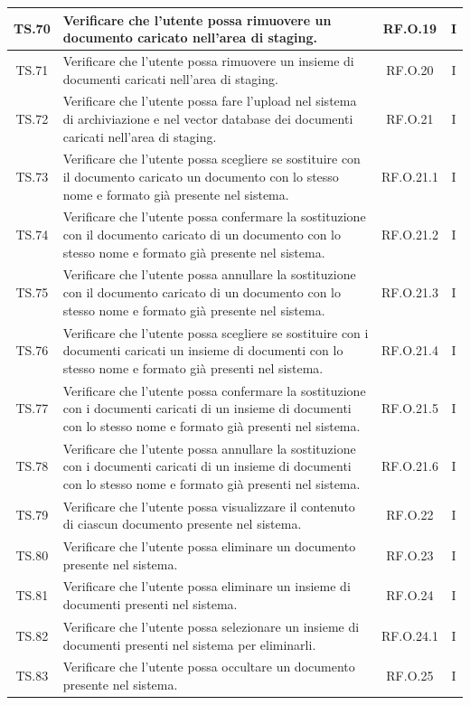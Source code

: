 \begin{xltabular}{\textwidth}{|c|X|c|c|}
\hline
TS.70 & Verificare che l'utente possa rimuovere un documento caricato nell’area di staging. & RF.O.19 & I \\
\hline
TS.71 & Verificare che l'utente possa rimuovere un insieme di documenti caricati nell’area di staging. & RF.O.20 & I \\
\hline
TS.72 & Verificare che l'utente possa fare l’upload nel sistema di archiviazione e nel vector database dei documenti caricati nell’area di staging. & RF.O.21 & I \\
\hline
TS.73 & Verificare che l'utente possa scegliere se sostituire con il documento caricato un documento con lo stesso nome e formato già presente nel sistema. & RF.O.21.1 & I \\
\hline
TS.74 & Verificare che l'utente possa confermare la sostituzione con il documento caricato di un documento con lo stesso nome e formato già presente nel sistema. & RF.O.21.2 & I \\
\hline
TS.75 & Verificare che l'utente possa annullare la sostituzione con il documento caricato di un documento con lo stesso nome e formato già presente nel sistema. & RF.O.21.3 & I \\
\hline
TS.76 & Verificare che l'utente possa scegliere se sostituire con i documenti caricati un insieme di documenti con lo stesso nome e formato già presenti nel sistema. & RF.O.21.4 & I \\
\hline
TS.77 & Verificare che l'utente possa confermare la sostituzione con i documenti caricati di un insieme di documenti con lo stesso nome e formato già presenti nel sistema. & RF.O.21.5 & I \\
\hline
TS.78 & Verificare che l'utente possa annullare la sostituzione con i documenti caricati di un insieme di documenti con lo stesso nome e formato già presenti nel sistema. & RF.O.21.6 & I \\
\hline
TS.79 & Verificare che l'utente possa visualizzare il contenuto di ciascun documento presente nel sistema. & RF.O.22 & I \\
\hline
TS.80 & Verificare che l'utente possa eliminare un documento presente nel sistema. & RF.O.23 & I \\
\hline
TS.81 & Verificare che l'utente possa eliminare un insieme di documenti presenti nel sistema. & RF.O.24 & I \\
\hline
TS.82 & Verificare che l'utente possa selezionare un insieme di documenti presenti nel sistema per eliminarli. & RF.O.24.1 & I \\
\hline
TS.83 & Verificare che l'utente possa occultare un documento presente nel sistema. & RF.O.25 & I \\

\end{xltabular}

